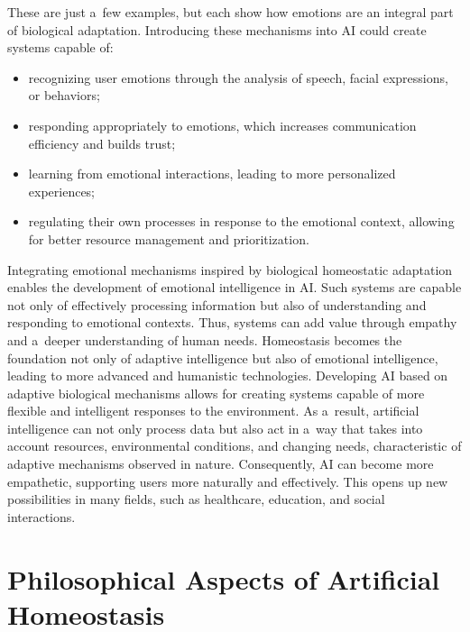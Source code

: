 These are just a~few examples, but each show how emotions are an integral part of biological adaptation. Introducing these mechanisms into AI could create systems capable of:



\begin{itemize}

\item recognizing user emotions through the analysis of speech, facial expressions, or behaviors;~

\item responding appropriately to emotions, which increases communication efficiency and builds trust;~

\item learning from emotional interactions, leading to more personalized experiences;~

\item regulating their own processes in response to the emotional context, allowing for better resource management and prioritization.~

\end{itemize}

Integrating emotional mechanisms inspired by biological homeostatic adaptation enables the development of emotional intelligence in AI. Such systems are capable not only of effectively processing information but also of understanding and responding to emotional contexts. Thus, systems can add value through empathy and a~deeper understanding of human needs. Homeostasis becomes the foundation not only of adaptive intelligence but also of emotional intelligence, leading to more advanced and humanistic technologies. Developing AI based on adaptive biological mechanisms allows for creating systems capable of more flexible and intelligent responses to the environment. As a~result, artificial intelligence can not only process data but also act in a~way that takes into account resources, environmental conditions, and changing needs, characteristic of adaptive mechanisms observed in nature. Consequently, AI can become more empathetic, supporting users more naturally and effectively. This opens up new possibilities in many fields, such as healthcare, education, and social interactions.~



\section*{Philosophical Aspects of Artificial Homeostasis}

